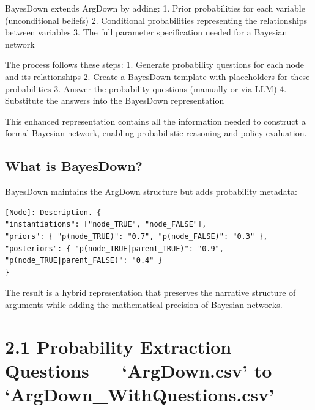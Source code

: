 \documentclass[
  11pt,
  letterpaper,
]{book}
\begin{document}
BayesDown extends ArgDown by adding: 1. Prior probabilities for each
variable (unconditional beliefs) 2. Conditional probabilities
representing the relationships between variables 3. The full parameter
specification needed for a Bayesian network

The process follows these steps: 1. Generate probability questions for
each node and its relationships 2. Create a BayesDown template with
placeholders for these probabilities 3. Answer the probability questions
(manually or via LLM) 4. Substitute the answers into the BayesDown
representation

This enhanced representation contains all the information needed to
construct a formal Bayesian network, enabling probabilistic reasoning
and policy evaluation.

\subsection{What is BayesDown?}\label{what-is-bayesdown}

BayesDown maintains the ArgDown structure but adds probability metadata:

\begin{verbatim}
[Node]: Description. {
"instantiations": ["node_TRUE", "node_FALSE"],
"priors": { "p(node_TRUE)": "0.7", "p(node_FALSE)": "0.3" },
"posteriors": { "p(node_TRUE|parent_TRUE)": "0.9", "p(node_TRUE|parent_FALSE)": "0.4" }
}
\end{verbatim}

The result is a hybrid representation that preserves the narrative
structure of arguments while adding the mathematical precision of
Bayesian networks.

\section{2.1 Probability Extraction Questions --- `ArgDown.csv' to
`ArgDown\_WithQuestions.csv'}\label{probability-extraction-questions-argdown.csv-to-argdown_withquestions.csv}
\end{document}
